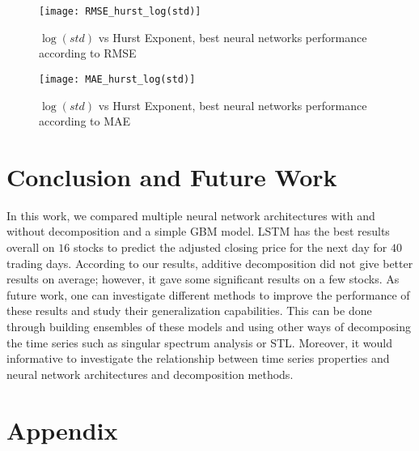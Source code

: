 \documentclass[12pt, A4]{article}
\begin{document}
\begin{figure}[H]
	\centering
	\texttt{[image: RMSE\_hurst\_log(std)]}
	\caption{$\log(std)$ vs Hurst Exponent, best neural networks performance according to RMSE}
	\label{RMSE_hurst_log(std)}
\end{figure}

\begin{figure}[H]
	\centering
	\texttt{[image: MAE\_hurst\_log(std)]}
	\caption{$\log(std)$ vs Hurst Exponent, best neural networks performance according to MAE}
	\label{MAE_hurst_log(std)}
\end{figure}

\section{Conclusion and Future Work}
In this work, we compared multiple neural network architectures with and without decomposition and a simple GBM model. LSTM has the best results overall on $16$ stocks to predict the adjusted closing price for the next day for $40$ trading days. According to our results, additive decomposition did not give better results on average; however, it gave some significant results on a few stocks. As future work, one can investigate different methods to improve the performance of these results and study their generalization capabilities. This can be done through building ensembles of these models and using other ways of decomposing the time series such as singular spectrum analysis or STL.  Moreover, it would informative to investigate the relationship between time series properties and neural network architectures and decomposition methods.




\clearpage

\section{Appendix}
\end{document}
